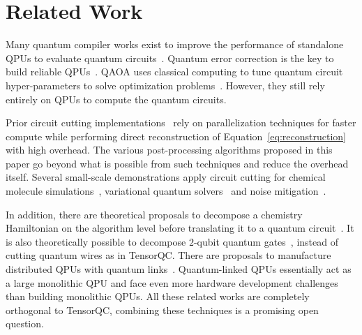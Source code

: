 \section{Related Work}\label{sec:related_work}
Many quantum compiler works exist to improve the performance of standalone QPUs to evaluate quantum circuits~\cite{nannicini2021optimal,tan2020optimality,murali2019noise,ding2020systematic,murali2020software,tang2024alpharouter}.
Quantum error correction is the key to build reliable QPUs~\cite{fowler2012surface,bravyi2012subsystem,javadi2017optimized,yoder2017surface,litinski2019game}.
QAOA uses classical computing to tune quantum circuit hyper-parameters to solve optimization problems~\cite{farhi2014quantum,tomesh2021coreset}.
However, they still rely entirely on QPUs to compute the quantum circuits.

Prior circuit cutting implementations~\cite{tang2021cutqc} rely on parallelization techniques for faster compute
while performing direct reconstruction of Equation~\ref{eq:reconstruction} with high overhead.
The various post-processing algorithms proposed in this paper go beyond what is possible from such techniques
and reduce the overhead itself.
Several small-scale demonstrations apply circuit cutting for chemical molecule simulations~\cite{eddins2022doubling},
variational quantum solvers~\cite{yuan2021quantum} and noise mitigation~\cite{basu2021qer}.

In addition, there are theoretical proposals to decompose a chemistry Hamiltonian on the algorithm level before translating it to a quantum circuit~\cite{eddins2022doubling}.
It is also theoretically possible to decompose $2$-qubit quantum gates~\cite{piveteau2023circuit},
instead of cutting quantum wires as in TensorQC.
There are proposals to manufacture distributed QPUs with quantum links~\cite{smith2022scaling,ang2024arquin}.
Quantum-linked QPUs essentially act as a large monolithic QPU and face even more hardware development challenges than building monolithic QPUs.
All these related works are completely orthogonal to TensorQC,
combining these techniques is a promising open question.